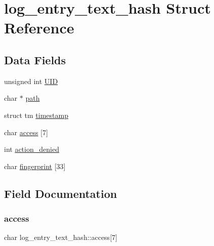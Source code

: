 \hypertarget{structlog__entry__text__hash}{}\section{log\+\_\+entry\+\_\+text\+\_\+hash Struct Reference}
\label{structlog__entry__text__hash}
\subsection*{Data Fields}
\begin{DoxyCompactItemize}
\item 
unsigned int \hyperlink{structlog__entry__text__hash_a68c5ad6594b98c96c933705d5d2b6167_a68c5ad6594b98c96c933705d5d2b6167}{U\+ID}
\item 
char $\ast$ \hyperlink{structlog__entry__text__hash_a991fd47833c6a7e56c8b0713ef85870e_a991fd47833c6a7e56c8b0713ef85870e}{path}
\item 
struct tm \hyperlink{structlog__entry__text__hash_af528ed5b63af8fed3be408fdbe36195e_af528ed5b63af8fed3be408fdbe36195e}{timestamp}
\item 
char \hyperlink{structlog__entry__text__hash_a063ec2686e19fb9054ecea7e1bafa171_a063ec2686e19fb9054ecea7e1bafa171}{access} \mbox{[}7\mbox{]}
\item 
int \hyperlink{structlog__entry__text__hash_acd30ad7fd2030eb270130884aa559aa8_acd30ad7fd2030eb270130884aa559aa8}{action\+\_\+denied}
\item 
char \hyperlink{structlog__entry__text__hash_a31ffdc8e1cf0fcaba871975eb56ed4ce_a31ffdc8e1cf0fcaba871975eb56ed4ce}{fingerprint} \mbox{[}33\mbox{]}
\end{DoxyCompactItemize}


\subsection{Field Documentation}
\mbox{\label{structlog__entry__text__hash_a063ec2686e19fb9054ecea7e1bafa171_a063ec2686e19fb9054ecea7e1bafa171}} 
\subsubsection{\texorpdfstring{access}{access}}
{\footnotesize\ttfamily char log\+\_\+entry\+\_\+text\+\_\+hash\+::access\mbox{[}7\mbox{]}}

